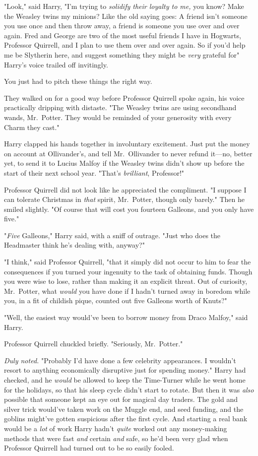 "Look," said Harry, "I'm trying to \emph{solidify their loyalty to me,} you
know? Make the Weasley twins my minions? Like the old saying goes: A friend
isn't someone you use once and then throw away, a friend is someone you use
over and over again. Fred and George are two of the most useful friends I have
in Hogwarts, Professor Quirrell, and I plan to use them over and over again. So
if you'd help me be Slytherin here, and suggest something they might be
\emph{very} grateful for{\el}" Harry's voice trailed off invitingly.

You just had to pitch these things the right way.

They walked on for a good way before Professor Quirrell spoke again, his voice
practically dripping with distaste. "The Weasley twins are using secondhand
wands, Mr.~Potter. They would be reminded of your generosity with every Charm
they cast."

Harry clapped his hands together in involuntary excitement. Just put the money
on account at Ollivander's, and tell Mr.~Ollivander to never refund it---no,
better yet, to send it to Lucius Malfoy if the Weasley twins didn't show up
before the start of their next school year. "That's \emph{brilliant},
Professor!"

Professor Quirrell did not look like he appreciated the compliment. "I suppose
I can tolerate Christmas in \emph{that} spirit, Mr.~Potter, though only
barely." Then he smiled slightly. "Of course that will cost you fourteen
Galleons, and you only have five."

"\emph{Five} Galleons," Harry said, with a sniff of outrage. "Just who does the
Headmaster think he's dealing with, anyway?"

"I think," said Professor Quirrell, "that it simply did not occur to him to
fear the consequences if you turned your ingenuity to the task of obtaining
funds. Though you were wise to lose, rather than making it an explicit threat.
Out of curiosity, Mr.~Potter, what \emph{would} you have done if I hadn't
turned away in boredom while you, in a fit of childish pique, counted out five
Galleons worth of Knuts?"

"Well, the easiest way would've been to borrow money from Draco Malfoy," said
Harry.

Professor Quirrell chuckled briefly. "Seriously, Mr.~Potter."

\emph{Duly noted.} "Probably I'd have done a few celebrity appearances. I
wouldn't resort to anything economically disruptive just for spending money."
Harry had checked, and he \emph{would} be allowed to keep the Time-Turner while
he went home for the holidays, so that his sleep cycle didn't start to rotate.
But then it was \emph{also} possible that someone kept an eye out for magical
day traders. The gold and silver trick would've taken work on the Muggle end,
and seed funding, and the goblins might've gotten suspicious after the first
cycle. And starting a real bank would be a \emph{lot} of work{\el} Harry
hadn't \emph{quite} worked out any money-making methods that were fast
\emph{and} certain \emph{and} safe, so he'd been very glad when Professor
Quirrell had turned out to be so easily fooled.

